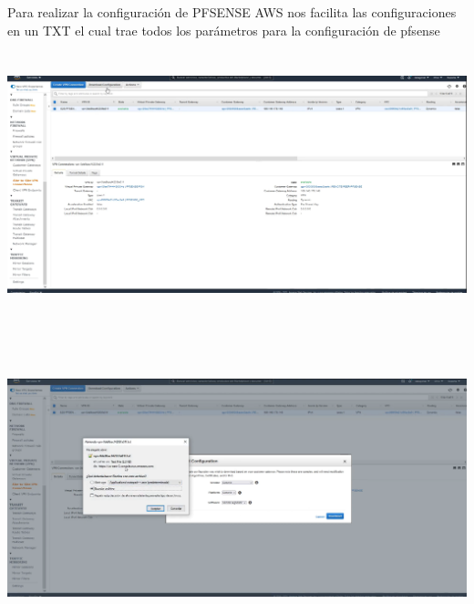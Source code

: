 \documentclass{article} %
\begin{document}
\noindent 

\noindent Para realizar la configuraci\'{o}n de PFSENSE AWS nos facilita las configuraciones en un TXT el cual trae todos los par\'{a}metros para la configuraci\'{o}n de pfsense

\noindent 

\noindent 

\noindent 

\noindent \includegraphics*[width=6.54in, height=3.02in, trim=0.00in 0.98in 1.94in 0.00in]{image22}

\noindent 

\noindent 

\noindent 

\noindent \includegraphics*[width=6.71in, height=3.51in, trim=0.00in 0.23in 1.17in 0.00in]{image23}

\noindent 

\noindent 

\noindent 

\noindent 
\end{document}
